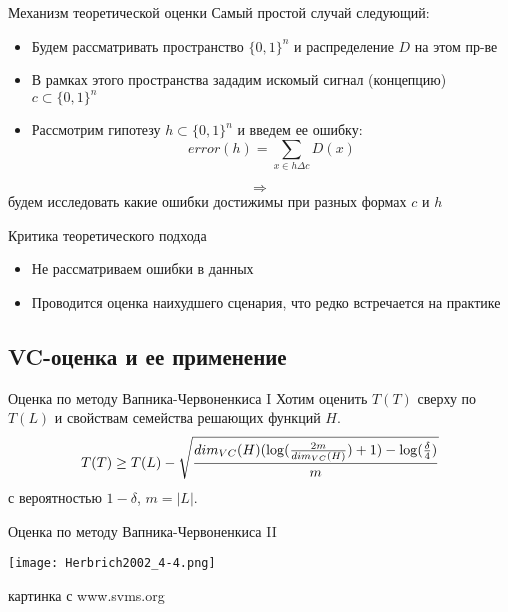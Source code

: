 \documentclass[14pt, fleqn, xcolor={dvipsnames, table}]{beamer}
\begin{document}
\begin{frame}{Механизм теоретической оценки}
Самый простой случай следующий:
\begin{itemize}
  \item Будем рассматривать пространство $\{0,1\}^n$ и распределение $D$ на этом пр-ве
  \item В рамках этого пространства зададим искомый сигнал (концепцию) $c \subset \{0,1\}^n$
  \item Рассмотрим гипотезу $h \subset \{0,1\}^n$ и введем ее ошибку:
  $$
  error(h) = \sum_{x \in h\Delta c} D(x)
  $$
\end{itemize}
$$\Rightarrow$$ будем исследовать какие ошибки достижимы при разных формах $c$ и $h$
\end{frame}

\begin{frame}{Критика теоретического подхода}
\begin{itemize}
  \item Не рассматриваем ошибки в данных
  \item Проводится оценка наихудшего сценария, что редко встречается на практике
\end{itemize}
\end{frame}


\subsection{VC-оценка и ее применение}

\begin{frame}{Оценка по методу Вапника-Червоненкиса I}
Хотим оценить $T(T)$ сверху по $T(L)$ и свойствам семейства решающих функций $H$.\\
$$
T(T) \ge T(L) - \sqrt{dim_{VC}(H)(\log(\frac{2m}{dim_{VC}(H)})+1)-\log(\frac{\delta}{4})\over m}
$$
с вероятностью $1-\delta$, $m = |L|$.
\end{frame}

\begin{frame}{Оценка по методу Вапника-Червоненкиса II}
\begin{center}
\texttt{[image: Herbrich2002\_4-4.png]}
\end{center}
{\footnotesize картинка с www.svms.org}
\end{frame}
\end{document}
